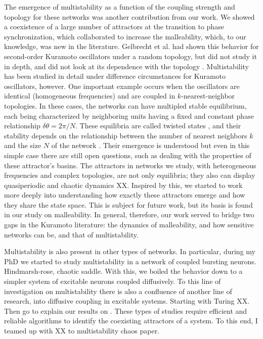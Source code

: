 The emergence of multistability as a function of the coupling strength and topology for these networks was another contribution from our work. We showed a coexistence of a large number of attractors at the transition to phase synchronization, which collaborated to increase the malleability, which, to our knowledge, was new in the literature. Gelbrecht et al. had shown this behavior for second-order Kuramoto oscillators under a random topology, but did not study it in depth, and did not look at its dependence with the topology \cite{}. Multistability has been studied in detail under difference circumstances for Kuramoto oscillators, however. One important example occurs when the oscillators are identical (homogeneous frequencies) and are coupled in $k$-nearest-neighbor topologies. In these cases, the networks can have multipled stable equilibrium, each being characterized by neighboring units having a fixed and constant phase relationship $\delta \theta = 2\pi/N$. These equilibria are called twisted states \cite{}, and their stability depends on the relationship between the number of nearest neighbors $k$ and the size $N$ of the network \cite{sparseonesthatdo}. Their emergence is understood but even in this simple case there are still open questions, such as dealing with the properties of these attractor's basins. The attractors in networks we study, with heterogeneous frequencies and complex topologies, are not only equilibria; they also can display quasiperiodic and chaotic dynamics XX. Inspired by this, we started to work more deeply into understanding how exactly these attractors emerge and how they share the state space. This is subject for future work, but its basis is found in our study on malleability. In general, therefore, our work served to bridge two gaps in the Kuramoto literature: the dynamics of malleability, and how sensitive networks can be, and that of multistability. 


Multistability is also present in other types of networks. In particular, during my PhD we started to study multistability in a network of coupled bursting neurons. Hindmarsh-rose, chaotic saddle. With this, we boiled the behavior down to a simpler system of excitable neurons coupled diffusively. To this line of investigation on multistability there is also a confluence of another line of research, into diffusive coupling in excitable systems. Starting with Turing XX. Then go to explain our results on . These types of studies require efficient and reliable algorithms to  identify the coexisting attractors of a system. To this end, I teamed up with XX to multistability chaos paper.


